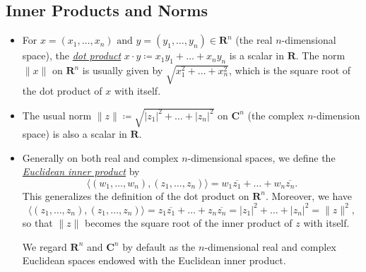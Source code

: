\documentclass[11pt]{article}
\newcommand{\df}[1]{\ul{\textit{\textsf{#1}}}}
\newcommand{\R}{\mathbf{R}}
\newcommand{\C}{\mathbf{C}}
\newcommand{\conj}[1]{\overline{#1}}
\newcommand{\inp}[2]{\langle #1, #2 \rangle}
\newcommand{\abs}[1]{\lvert #1 \rvert}
\begin{document}
\subsection{Inner Products and Norms}
\begin{itemize}
    \item For $x=(x_1,\dots,x_n) \text{ and } y=(y_1,\dots,y_n) \in \R^n$ (the real $n$-dimensional space), the \df{dot product} $x \cdot y \coloneqq x_1y_1+\dots+x_ny_n$ is a scalar in $\R$. The norm $\|x\|$ on $\R^n$ is usually given by $\sqrt{x_1^2+\dots+x_n^2}$, which is the square root of the dot product of $x$ with itself.
    \item The usual norm $\|z\| \coloneqq  \sqrt{\abs{z_1}^2+\dots+\abs{z_n}^2}$ on $\C^n$ (the complex $n$-dimension space) is also a scalar in $\R$.
    \item Generally on both real and complex $n$-dimensional spaces, we define the \df{Euclidean inner product} by $$\inp{(w_1,\dots,w_n)}{(z_1,\dots,z_n)} =  w_1\conj{z_1}+\dots+w_n\conj{z_n}.$$ This generalizes the definition of the dot product on $\R^n$. Moreover, we have $$\inp{(z_1,\dots,z_n)}{(z_1,\dots,z_n)} = z_1\conj{z_1}+\dots+z_n\conj{z_n} = \abs{z_1}^2 + \dots + \abs{z_n}^2 = \|z\|^2,$$ so that $\|z\|$ becomes the square root of the inner product of $z$ with itself.
    
    We regard $\R^n$ and $\C^n$ by default as the $n$-dimensional real and complex Euclidean spaces endowed with the Euclidean inner product. 
    

\end{itemize}
\end{document}
